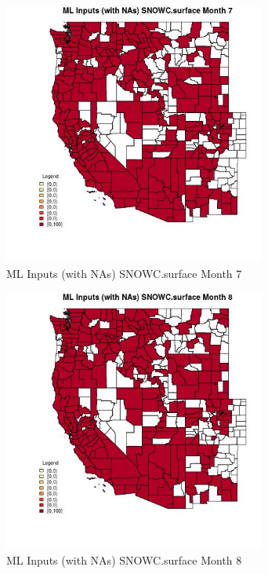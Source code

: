 \begin{figure} 
\centering  
\includegraphics[width=0.77\textwidth]{Code_Outputs/Report_ML_input_PM25_Step4_part_e_de_duplicated_aves_compiled_2019-05-21wNAs_CountySNOWCsurfacemedianMonth7.jpg} 
\caption{\label{fig:Report_ML_input_PM25_Step4_part_e_de_duplicated_aves_compiled_2019-05-21wNAsCountySNOWCsurfacemedianMonth7}ML Inputs (with NAs) SNOWC.surface Month 7} 
\end{figure} 
 

\begin{figure} 
\centering  
\includegraphics[width=0.77\textwidth]{Code_Outputs/Report_ML_input_PM25_Step4_part_e_de_duplicated_aves_compiled_2019-05-21wNAs_CountySNOWCsurfacemedianMonth8.jpg} 
\caption{\label{fig:Report_ML_input_PM25_Step4_part_e_de_duplicated_aves_compiled_2019-05-21wNAsCountySNOWCsurfacemedianMonth8}ML Inputs (with NAs) SNOWC.surface Month 8} 
\end{figure} 
 

